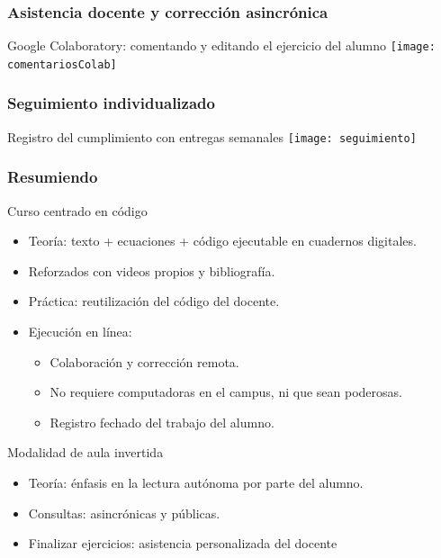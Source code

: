 \documentclass[aspectratio=169]{beamer}
\begin{document}
\begin{frame}
	\frametitle{Asistencia docente y corrección asincrónica}
	\begin{block}{Google Colaboratory: comentando y editando el ejercicio del alumno}
		\texttt{[image: comentariosColab]}
	\end{block}
\end{frame}


\begin{frame}
	\frametitle{Seguimiento individualizado}
	\begin{block}{Registro del cumplimiento con entregas semanales}
		\texttt{[image: seguimiento]}
	\end{block}
\end{frame}


\begin{frame}
	\frametitle{Resumiendo}
	\begin{block}{Curso centrado en código}
		\begin{itemize}[<+->]
			\item Teoría: texto + ecuaciones + código ejecutable en cuadernos digitales.
			\item Reforzados con videos propios y bibliografía.
			\item Práctica: reutilización del código del docente.
			\item Ejecución en línea:
			\begin{itemize}[<+->]
				\item Colaboración y corrección remota.
				\item No requiere computadoras en el campus, ni que sean poderosas.
				\item Registro fechado del trabajo del alumno.
			\end{itemize}
		\end{itemize}
	\end{block}
	\begin{block}{Modalidad de aula invertida}
		\begin{itemize}[<+->]
			\item Teoría: énfasis en la lectura autónoma por parte del alumno.
			\item Consultas: asincrónicas y públicas.
			\item Finalizar ejercicios: asistencia personalizada del docente
		\end{itemize}
	\end{block}
\end{frame}
	
\end{document}
